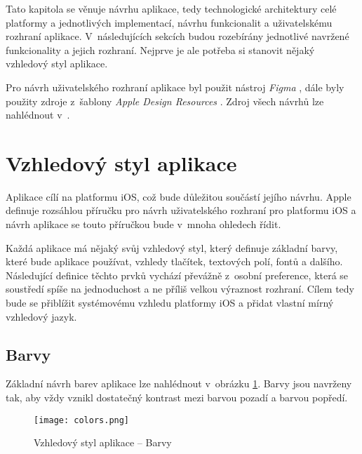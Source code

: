 Tato kapitola se věnuje návrhu aplikace, tedy technologické architektury celé platformy a jednotlivých implementací, návrhu funkcionalit a uživatelskému rozhraní aplikace. V~následujících sekcích budou rozebírány jednotlivé navržené funkcionality a jejich rozhraní. Nejprve je ale potřeba si stanovit nějaký vzhledový styl aplikace.

Pro návrh uživatelského rozhraní aplikace byl použit nástroj \emph{Figma} \cite{figma}, dále byly použity zdroje z~šablony \emph{Apple Design Resources} \cite{apple-design-resources}. Zdroj všech návrhů lze nahlédnout v~\cite{trackee-app-figma}.

\section{Vzhledový styl aplikace}

Aplikace cílí na platformu iOS, což bude důležitou součástí jejího návrhu. Apple definuje rozsáhlou příručku pro návrh uživatelského rozhraní pro platformu iOS \cite{apple-design-guidelines-ios} a návrh aplikace se touto příručkou bude v~mnoha ohledech řídit.

Každá aplikace má nějaký svůj vzhledový styl, který definuje základní barvy, které bude aplikace používat, vzhledy tlačítek, textových polí, fontů a dalšího. Následující definice těchto prvků vychází převážně z~osobní preference, která se soustředí spíše na jednoduchost a ne příliš velkou výraznost rozhraní. Cílem tedy bude se přiblížit systémovému vzhledu platformy iOS a přidat vlastní mírný vzhledový jazyk.

\subsection{Barvy}

Základní návrh barev aplikace lze nahlédnout v~obrázku \ref{fig:colors}. Barvy jsou navrženy tak, aby vždy vznikl dostatečný kontrast mezi barvou pozadí a barvou popředí.

\begin{figure}[h]
	\centering
	\texttt{[image: colors.png]}
	\caption{Vzhledový styl aplikace – Barvy}
	\label{fig:colors}
\end{figure}


